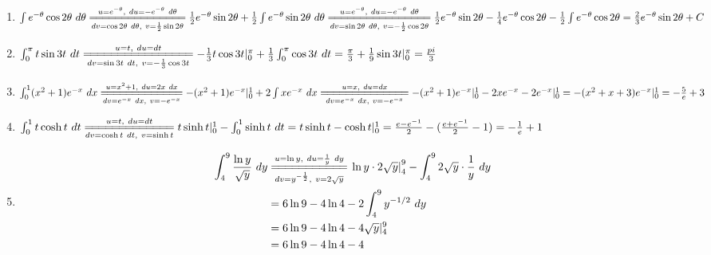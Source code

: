 \documentclass[a4]{article}
\begin{document}
\begin{enumerate}[label={\bf{}\arabic*}.]
\item%
	$\int e^{-\theta}\cos2\theta\ d\theta\overset{u=e^{-\theta},\ du=-e^{-\theta}\ d\theta}{\underset{dv=\cos2\theta\ d\theta,\ v=\frac{1}{2}\sin2\theta}{=\joinrel=\joinrel=\joinrel=\joinrel=\joinrel=\joinrel=\joinrel=\joinrel=\joinrel=\joinrel=\joinrel=\joinrel=\joinrel=\joinrel=}}\frac{1}{2}e^{-\theta}\sin2\theta+\frac{1}{2}\int e^{-\theta}\sin2\theta\ d\theta\overset{u=e^{-\theta},\ du=-e^{-\theta}\ d\theta}{\underset{dv=\sin2\theta\ d\theta,\ v=-\frac{1}{2}\cos2\theta}{=\joinrel=\joinrel=\joinrel=\joinrel=\joinrel=\joinrel=\joinrel=\joinrel=\joinrel=\joinrel=\joinrel=\joinrel=\joinrel=\joinrel=\joinrel=}}\frac{1}{2}e^{-\theta}\sin2\theta-\frac{1}{4}e^{-\theta}\cos2\theta-\frac{1}{2}\int e^{-\theta}\cos2\theta=\frac{2}{3}e^{-\theta}\sin2\theta+C$

\item%
	$\int_0^\pi t\sin3t\ dt\overset{u=t,\ du=dt}{\underset{dv=\sin3t\ dt,\ v=-\frac{1}{3}\cos3t}{=\joinrel=\joinrel=\joinrel=\joinrel=\joinrel=\joinrel=\joinrel=\joinrel=\joinrel=\joinrel=\joinrel=\joinrel=\joinrel=\joinrel=\joinrel=}}-\frac{1}{3}t\cos3t|_0^\pi+\frac{1}{3}\int_0^\pi\cos3t\ dt=\frac{\pi}{3}+\frac{1}{9}\sin3t|_0^\pi=\frac{pi}{3}$

\item%
	$\int_0^1(x^2+1)e^{-x}\ dx\overset{u=x^2+1,\ du=2x\ dx}{\underset{dv=e^{-x}\ dx,\ v=-e^{-x}}{=\joinrel=\joinrel=\joinrel=\joinrel=\joinrel=\joinrel=\joinrel=\joinrel=\joinrel=\joinrel=\joinrel=\joinrel=}}-(x^2+1)e^{-x}|_0^1+2\int xe^{-x}\ dx\overset{u=x,\ du=dx}{\underset{dv=e^{-x}\ dx,\ v=-e^{-x}}{=\joinrel=\joinrel=\joinrel=\joinrel=\joinrel=\joinrel=\joinrel=\joinrel=\joinrel=\joinrel=\joinrel=\joinrel=\joinrel=}}-(x^2+1)e^{-x}|_0^1-2xe^{-x}-2e^{-x}|_0^1=-(x^2+x+3)e^{-x}|_0^1=-\frac{5}{e}+3$

\item%
	$\int_0^1t\cosh t\ dt\overset{u=t,\ du=dt}{\underset{dv=\cosh t\ dt,\ v=\sinh t}{=\joinrel=\joinrel=\joinrel=\joinrel=\joinrel=\joinrel=\joinrel=\joinrel=\joinrel=\joinrel=\joinrel=\joinrel=}}t\sinh t|_0^1-\int_0^1\sinh t\ dt=t\sinh t-\cosh t|_0^1=\frac{e-e^{-1}}{2}-(\frac{e+e^{-1}}{2}-1)=-\frac{1}{e}+1$

\item%
	\begin{align*}
	\int_4^9\frac{\ln y}{\sqrt{y}}\ dy&\overset{u=\ln y,\ du=\frac{1}{y}\ dy}{\underset{dv=y^{-\frac{1}{2}},\ v=2\sqrt{y}}{=\joinrel=\joinrel=\joinrel=\joinrel=\joinrel=\joinrel=\joinrel=\joinrel=\joinrel=\joinrel=}}\left.\ln y\cdot2\sqrt{y}\right|_4^9-\int_4^92\sqrt{y}\cdot\frac{1}{y}\ dy\\
	&=6\ln9-4\ln4-2\int_4^9y^{-1/2}\ dy\\
	&=6\ln9-4\ln4-4\sqrt{y}|_4^9\\
	&=6\ln9-4\ln4-4
	\end{align*}


\end{enumerate}
\end{document}
